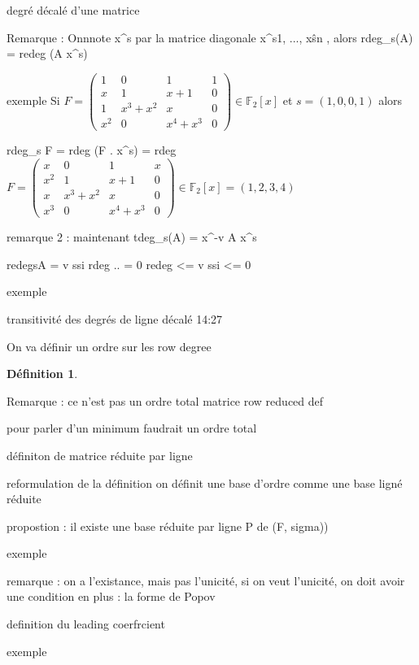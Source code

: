 \documentclass[a4paper,12pt]{report}  %
\theoremstyle{definitionstyle}
\newtheorem{definition}{Définition}[chapter] %
\theoremstyle{examplestyle}
\theoremstyle{remarkstyle}
\theoremstyle{propositionstyle}
\theoremstyle{theoremstyle}
\theoremstyle{proofstyle}
\begin{document}
	degré décalé d'une matrice
	
	Remarque : Onnnote x^s par la matrice diagonale x^s1, ..., xŝn , alors rdeg_s(A) = redeg (A x^s)

	
	exemple
	Si $F =
	\left(\begin{array}{rrrr}
		1 & 0 & 1 & 1 \\
		x & 1 & x + 1 & 0 \\
		1 & x^{3} + x^{2} & x & 0 \\
		x^{2} & 0 & x^{4} + x^{3} & 0
	\end{array}\right) \in \mathbb{F}_2[x]
	$ et $s =(1, 0, 0, 1)$ alors 
	
	rdeg_s F = rdeg (F . x^s) = rdeg $F =
	\left(\begin{array}{rrrr}
		x & 0 & 1 & x \\
		x^2 & 1 & x + 1 & 0 \\
		x & x^{3} + x^{2} & x & 0 \\
		x^{3} & 0 & x^{4} + x^{3} & 0
	\end{array}\right) \in \mathbb{F}_2[x]
 =(1, 2, 3, 4)$
	
	remarque 2 : maintenant tdeg_s(A) = x^-v A x^s
	
	redegsA = v ssi rdeg .. = 0
	redeg <= v ssi <= 0
	
	exemple 
	
	transitivité  des degrés de ligne décalé 14:27
	
	On va définir un ordre sur les row degree
	
	\begin{definition}
		
	\end{definition}
	
	Remarque : ce n'est pas un ordre total
	matrice row reduced def
	
	
	pour parler d'un minimum faudrait un ordre total
	
	
	définiton de matrice réduite par ligne
	
	reformulation de la définition
	on définit une base d'ordre comme une base ligné réduite
	
	propostion : il existe une base réduite par ligne P de (F, sigma))
	
	exemple
	
	remarque : on a l'existance, mais pas l'unicité, si on veut l'unicité, on doit avoir une condition en plus : la forme de Popov
	
	definition du leading coerfrcient
	
	exemple
	
\end{document}
